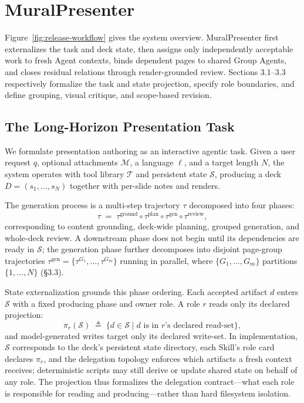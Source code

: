 
\section{MuralPresenter}

Figure~\ref{fig:release-workflow} gives the system overview. MuralPresenter first externalizes the task and deck state, then assigns only independently acceptable work to fresh Agent contexts, binds dependent pages to shared Group Agents, and closes residual relations through render-grounded review. Sections 3.1--3.3 respectively formalize the task and state projection, specify role boundaries, and define grouping, visual critique, and scope-based revision.

\subsection{The Long-Horizon Presentation Task}

We formulate presentation authoring as an interactive agentic task. Given a user request \(q\), optional attachments \(\mathcal{M}\), a language \(\ell\), and a target length \(N\), the system operates with tool library \(\mathcal{T}\) and persistent state \(\mathcal{S}\), producing a deck \(D=(s_1,\ldots,s_N)\) together with per-slide notes and renders.

The generation process is a multi-step trajectory \(\tau\) decomposed into four phases: \[
\tau \;=\; \tau^{\mathrm{ground}} \circ \tau^{\mathrm{plan}} \circ \tau^{\mathrm{gen}} \circ \tau^{\mathrm{review}},
\] corresponding to content grounding, deck-wide planning, grouped generation, and whole-deck review. A downstream phase does not begin until its dependencies are ready in \(\mathcal{S}\); the generation phase further decomposes into disjoint page-group trajectories \(\tau^{\mathrm{gen}}=\{\tau^{G_1},\ldots,\tau^{G_m}\}\) running in parallel, where \(\{G_1,\ldots,G_m\}\) partitions \(\{1,\ldots,N\}\) (§3.3).

State externalization grounds this phase ordering. Each accepted artifact \(d\) enters \(\mathcal{S}\) with a fixed producing phase and owner role. A role \(r\) reads only its declared projection: \[
\pi_r(\mathcal{S}) \;\triangleq\; \{d \in \mathcal{S} \mid d \text{ is in } r\text{'s declared read-set}\},
\] and model-generated writes target only its declared write-set. In implementation, \(\mathcal{S}\) corresponds to the deck's persistent state directory, each Skill's role card declares \(\pi_r\), and the delegation topology enforces which artifacts a fresh context receives; deterministic scripts may still derive or update shared state on behalf of any role. The projection thus formalizes the delegation contract—what each role is responsible for reading and producing—rather than hard filesystem isolation.


